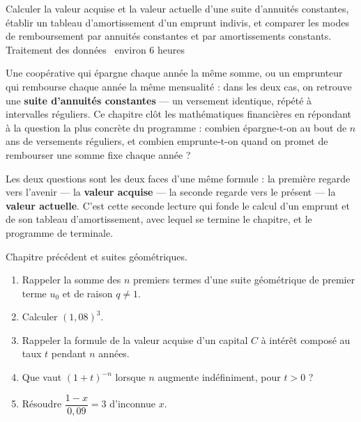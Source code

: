   {Calculer la valeur acquise et la valeur actuelle d'une suite d'annuités
   constantes, établir un tableau d'amortissement d'un emprunt indivis, et
   comparer les modes de remboursement par annuités constantes et par
   amortissements constants.}
  {Traitement des données \textbullet\ environ 6 heures}

Une coopérative qui épargne chaque année la même somme, ou un emprunteur qui
rembourse chaque année la même mensualité : dans les deux cas, on retrouve
une \textbf{suite d'annuités constantes} — un versement identique, répété à
intervalles réguliers. Ce chapitre clôt les mathématiques financières en
répondant à la question la plus concrète du programme : combien épargne-t-on
au bout de $n$ ans de versements réguliers, et combien emprunte-t-on quand on
promet de rembourser une somme fixe chaque année ?

Les deux questions sont les deux faces d'une même formule : la première
regarde vers l'avenir — la \textbf{valeur acquise} — la seconde regarde vers
le présent — la \textbf{valeur actuelle}. C'est cette seconde lecture qui
fonde le calcul d'un emprunt et de son tableau d'amortissement, avec lequel
se termine le chapitre, et le programme de terminale.

\begin{revision}
Chapitre précédent et suites géométriques.

\begin{enumerate}[label=\textbf{\arabic*.}, leftmargin=*, itemsep=0.35em]
  \item Rappeler la somme des $n$ premiers termes d'une suite géométrique de
        premier terme $u_{0}$ et de raison $q \neq 1$.
  \item Calculer $(1{,}08)^{3}$.
  \item Rappeler la formule de la valeur acquise d'un capital $C$ à intérêt
        composé au taux $t$ pendant $n$ années.
  \item Que vaut $(1+t)^{-n}$ lorsque $n$ augmente indéfiniment, pour
        $t>0$ ?
  \item Résoudre $\dfrac{1-x}{0{,}09} = 3$ d'inconnue $x$.
\end{enumerate}
\end{revision}

